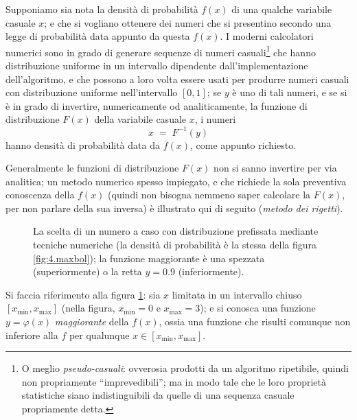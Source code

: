 Supponiamo sia nota la densit\`a di probabilit\`a $f(x)$ di
una qualche variabile casuale $x$; e che si vogliano
ottenere dei numeri che si presentino secondo una legge di
probabilit\`a data appunto da questa $f(x)$.  I moderni
calcolatori numerici sono in grado di generare sequenze di
numeri casuali\/\footnote{O meglio \emph{pseudo-casuali}:
  ovverosia prodotti da un algoritmo ripetibile, quindi non
  propriamente ``imprevedibili''; ma in modo tale che le
  loro propriet\`a statistiche siano indistinguibili da
  quelle di una sequenza casuale propriamente detta.}  che
hanno distribuzione uniforme in un intervallo dipendente
dall'implementazione dell'algoritmo, e che possono a loro
volta essere usati per produrre numeri casuali con
distribuzione uniforme nell'intervallo $[0,1]$; se $y$ \`e
uno di tali numeri, e se si \`e in grado di invertire,
numericamente od analiticamente, la funzione di
distribuzione $F(x)$ della variabile casuale $x$, i numeri
\begin{equation*}
  x \; = \; F^{-1}(y)
\end{equation*}
hanno densit\`a di probabilit\`a data da $f(x)$, come
appunto richiesto.

Generalmente le funzioni di distribuzione $F(x)$ non si
sanno invertire per via analitica; un metodo numerico spesso
impiegato, e che richiede la sola preventiva conoscenza
della $f(x)$ (quindi non bisogna nemmeno saper calcolare la
$F(x)$, per non parlare della sua inversa) \`e illustrato
qui di seguito (\emph{metodo
dei rigetti}).%
\begin{figure}[htbp]
  \vspace*{2ex}
  \begin{center} {
    
  } \end{center}
  \caption[Il metodo dei rigetti --- esempio]
    {La scelta di un numero a caso con distribuzione
    prefissata mediante tecniche numeriche (la densit\`a di
    probabilit\`a \`e la stessa della figura
    \ref{fig:4.maxbol}); la funzione maggiorante \`e una
    spezzata (superiormente) o la retta $y=0.9$
    (inferiormente).}
  \label{fig:8.maxbol}
\end{figure}
Si faccia riferimento alla figura \ref{fig:8.maxbol}: sia
$x$ limitata in un intervallo chiuso $[x_{\min}, x_{\max}]$
(nella figura, $x_{\min} = 0$ e $x_{\max} = 3$); e si
conosca una funzione $y=\varphi(x)$ \emph{maggiorante} della
$f(x)$, ossia una funzione che risulti comunque non
inferiore alla $f$ per qualunque $x \in [x_{\min},
x_{\max}]$.

